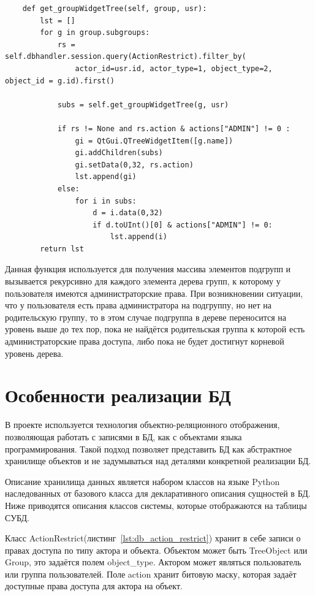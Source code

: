 \documentclass[utf8,usehyperref,12pt]{G7-32}
\begin{document}
\lstset{language=Python,caption=Обход дерева групп,label=lst:groups}
\begin{lstlisting}        
    def get_groupWidgetTree(self, group, usr):        
        lst = []
        for g in group.subgroups:
            rs = self.dbhandler.session.query(ActionRestrict).filter_by(
	            actor_id=usr.id, actor_type=1, object_type=2, object_id = g.id).first()
	            
            subs = self.get_groupWidgetTree(g, usr)
            
            if rs != None and rs.action & actions["ADMIN"] != 0 :
                gi = QtGui.QTreeWidgetItem([g.name])
                gi.addChildren(subs)
                gi.setData(0,32, rs.action)
                lst.append(gi)
            else:                
                for i in subs:
                    d = i.data(0,32)
                    if d.toUInt()[0] & actions["ADMIN"] != 0:
                        lst.append(i)                
        return lst
\end{lstlisting}

Данная функция используется для получения массива элементов подгрупп и вызывается рекурсивно для каждого элемента дерева групп, к которому у пользователя имеются администраторские права. При возникновении ситуации, что у пользователя есть права администратора на подгруппу, но нет на родительскую группу, то в этом случае подгруппа в дереве переносится на уровень выше до тех пор, пока не найдётся родительская группа к которой есть администраторские права доступа, либо пока не будет достигнут корневой уровень дерева.

\section{Особенности реализации БД}\label{sec:db_implement}
В проекте используется технология объектно-реляционного отображения, позволяющая работать с записями в БД, как с объектами языка программирования. Такой подход позволяет представить БД как абстрактное хранилище объектов и не задумываться над деталями конкретной реализации БД. 

Описание хранилища данных является набором классов на языке Python наследованных от базового класса для декларативного описания сущностей в БД. Ниже приводятся описания классов системы, которые отображаются на таблицы СУБД.

Класс ActionRestrict(листинг~\ref{lst:db_action_restrict}) хранит в себе записи о правах доступа по типу актора и объекта. Объектом может быть TreeObject или Group, это задаётся полем object\_type. Актором может являться пользователь или группа пользователей. Поле action хранит битовую маску, которая задаёт доступные права доступа для актора на объект.
\end{document}
